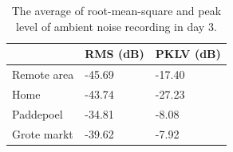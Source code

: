 \begin{table}[H]
\centering
\caption{The average of root-mean-square and peak level of ambient noise recording in day 3.}
\label{tab:ambient-noise-average-day3}
\begin{tabular}{lll} \toprule
            & \ac{RMS} (dB) & \ac{PKLV} (dB)  \\ \midrule
Remote area & -45.69                & -17.40  \\
Home        & -43.74                & -27.23  \\
Paddepoel   & -34.81                & -8.08   \\
Grote markt & -39.62              & -7.92     \\ \bottomrule
\end{tabular}
\end{table}

